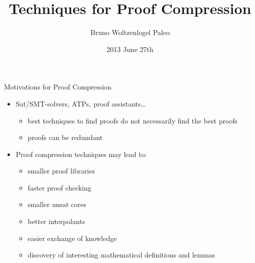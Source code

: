 \documentclass[9pt]{beamer}
\title[Techniques for Proof Compression]{Techniques for Proof Compression}
\author{Bruno Woltzenlogel Paleo}
\institute[] {
  \inst{}%
}
\date[27.06.13]
{2013 June 27th}
\newcommand{\mypause}{\pause}
\begin{document}
\begin{frame}
  \titlepage
\end{frame}


\newcommand{\C}{\mathcal{C}}
\newcommand{\CurryHoward}{\mathcal{I}}
\newcommand{\ND}{$\textbf{ND}$}
\newcommand{\NDd}{$\textbf{NDc}$}
\newenvironment{calculus}{\begin{center}\begin{Sbox}\begin{minipage}{0.95\textwidth}}{\end{minipage}\end{Sbox}\fbox{\TheSbox}\end{center}}


\newcommand{\tP}[1]{\xi[#1]}
\newcommand{\tN}[1]{\zeta[#1]}
\newcommand{\eS}{\epsilon}

\newcommand{\AtPosition}{\textrm{At}}

\begin{frame}{Motivations for Proof Compression}
\begin{itemize}
\item Sat/SMT-solvers, ATPs, proof assistants\ldots
	\begin{itemize}
	\item best techniques to find proofs do not necessarily find the best proofs
	\item proofs can be redundant 
	\end{itemize}
\mypause
\item Proof compression techniques may lead to: 
	\begin{itemize}
	\item smaller proof libraries
	\item faster proof checking
	\item smaller unsat cores
	\item better interpolants
	\item easier exchange of knowledge
	\item discovery of interesting mathematical definitions and lemmas
	\end{itemize}
\end{itemize}
\end{frame}
\end{document}
